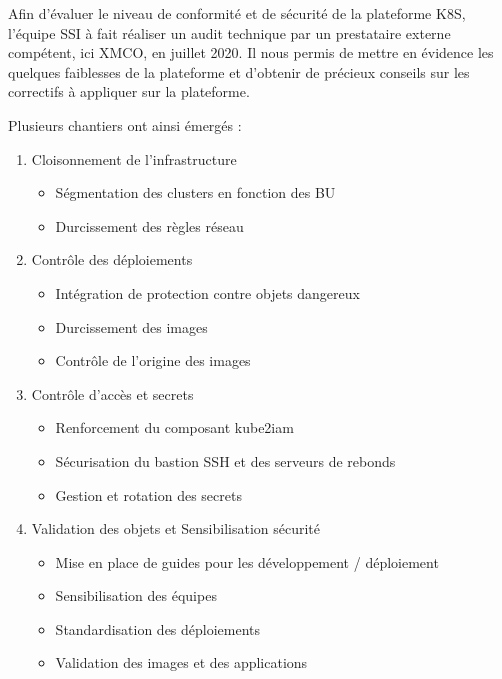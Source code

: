 Afin d'évaluer le niveau de conformité et de sécurité de la plateforme \ac{K8S}, l'équipe \ac{SSI} à fait réaliser un 
audit technique par un prestataire externe compétent, ici XMCO, en juillet 2020.
\newline Il nous permis de mettre en évidence les quelques faiblesses de la plateforme et d'obtenir de précieux conseils 
sur les correctifs à appliquer sur la plateforme.

Plusieurs chantiers ont ainsi émergés :
\begin{enumerate}
    \item Cloisonnement de l'infrastructure
    \begin{itemize}
        \item Ségmentation des clusters en fonction des \ac{BU}
        \item Durcissement des règles réseau
    \end{itemize}
    \item Contrôle des déploiements
        \begin{itemize}
        \item Intégration de protection contre objets dangereux
        \item Durcissement des images
        \item Contrôle de l'origine des images
    \end{itemize}
    \item Contrôle d'accès et secrets
    \begin{itemize}
        \item Renforcement du composant kube2iam
        \item Sécurisation du bastion SSH et des serveurs de rebonds
        \item Gestion et rotation des secrets
    \end{itemize}
    \item Validation des objets et Sensibilisation sécurité
    \begin{itemize}
        \item Mise en place de guides pour les développement / déploiement
        \item Sensibilisation des équipes
        \item Standardisation des déploiements
        \item Validation des images et des applications
    \end{itemize}
\end{enumerate}

\pagebreak

